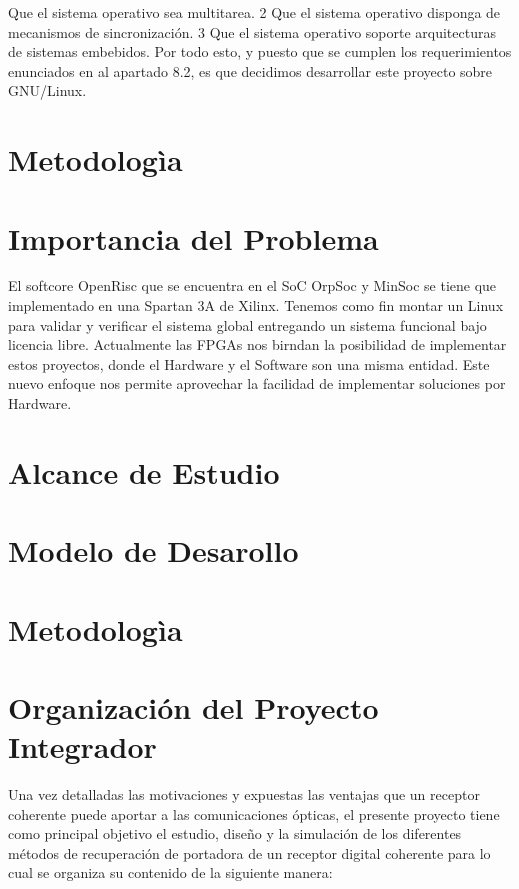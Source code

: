 Que el sistema operativo sea multitarea.
2
Que el sistema operativo disponga de mecanismos de sincronización. 3 Que el sistema operativo soporte arquitecturas de sistemas embebidos.
Por todo esto, y puesto que se cumplen los requerimientos enunciados en al apartado 8.2, es que decidimos desarrollar este proyecto sobre GNU/Linux.

\section{Metodologìa}



\section{Importancia del Problema}

El softcore OpenRisc  que se encuentra en el SoC OrpSoc y MinSoc se tiene que implementado en una Spartan 3A de Xilinx. Tenemos como fin montar un Linux para validar y verificar el sistema global entregando un sistema funcional bajo licencia libre.
Actualmente las FPGAs nos birndan la posibilidad de implementar estos proyectos, donde el Hardware y el Software son una misma entidad. Este nuevo enfoque nos permite aprovechar la facilidad de implementar soluciones por Hardware.

\section{Alcance de Estudio}
\section{Modelo de Desarollo}
\section{Metodologìa}



 \section{Organización del Proyecto Integrador}

 Una vez detalladas  las motivaciones y expuestas las  ventajas que un
 receptor  coherente puede  aportar a  las comunicaciones  ópticas, el
 presente proyecto tiene como  principal objetivo el estudio, diseño y
 la simulación de los  diferentes métodos de recuperación de portadora
 de un receptor digital coherente para lo cual se organiza
 su contenido de la siguiente manera:\\



